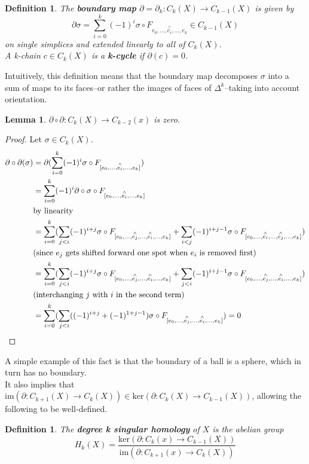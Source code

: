\documentclass{article}
\newtheorem{definition}[theorem]{Definition}
\newtheorem{lemma}[theorem]{Lemma}
\begin{document}
\begin{definition}
The \textbf{boundary map} $\partial=\partial_k\colon C_k(X)\to C_{k-1}(X)$ is given by\[\partial\sigma=\sum_{i=0}^k(-1)^i\sigma\circ F_{e_0,...,\overset{\wedge}{e_i},...,e_k}\in C_{k-1}(X)\]
on single simplices and extended linearly to all of $C_k(X)$.\\
A k-chain $c\in C_k(X)$ is a \textbf{k-cycle} if $\partial(c)=0$.
\end{definition}
\noindent Intuitively, this definition means that the boundary map decomposes $\sigma$ into a sum of maps to its faces--or rather the images of faces of $\Delta^k$--taking into account orientation.


\begin{lemma}
$\partial\circ\partial\colon C_k(X)\to C_{k-2}(x)$ is zero.
\end{lemma}
\begin{proof}
Let $\sigma\in C_k(X)$.
\begin{align*}
\partial\circ\partial (\sigma)&=\partial(\sum_{i=0}^k(-1)^i\sigma\circ F_{[e_0,...,\overset{\wedge}{e_i},...,e_k]})\\
&=\sum_{i=0}^k(-1)^i\partial\circ\sigma\circ F_{[e_0,...,\overset{\wedge}{e_i},...,e_k]} \\&\text{by linearity}\\
&=\sum_{i=0}^k(\sum_{j<i}(-1)^{i+j}\sigma\circ F_{[e_0,...,\overset{\wedge}{e_j},...,\overset{\wedge}{e_i},...,e_k]} + \sum_{i<j}(-1)^{i+j-1}\sigma\circ F_{[e_0,...,\overset{\wedge}{e_i},...,\overset{\wedge}{e_j},...,e_k]}) \\&\text{(since }e_j \text{ gets shifted forward one spot when }e_i\text{ is removed first)}\\
&=\sum_{i=0}^k(\sum_{j<i}(-1)^{i+j}\sigma\circ F_{[e_0,...,\overset{\wedge}{e_j},...,\overset{\wedge}{e_i},...,e_k]} + \sum_{j<i}(-1)^{i+j-1}\sigma\circ F_{[e_0,...,\overset{\wedge}{e_j},...,\overset{\wedge}{e_i},...,e_k]})
\\&\text{(interchanging }j\text{ with }i\text{ in the second term)}\\
&=\sum_{i=0}^k(\sum_{j<i}((-1)^{i+j}+(-1)^{1+j-1})\sigma\circ F_{[e_0,...,\overset{\wedge}{e_j},...,\overset{\wedge}{e_i},...,e_k]})=0 \qedhere
\end{align*}
\end{proof}

\noindent A simple example of this fact is that the boundary of a ball is a sphere, which in turn has no boundary.\\
It also implies that $\text{im}(\partial:C_{k+1}(X)\rightarrow C_k(X))\in\text{ker}(\partial:C_{k}(X)\rightarrow C_{k-1}(X))$,
allowing the following to be well-defined.
\begin{definition}
The \textbf{degree k singular homology} of $X$ is the abelian group
\[H_k(X)=\frac{\text{ker}(\partial:C_{k}(x)\rightarrow C_{k-1}(X))}{\text{im}(\partial:C_{k+1}(x)\rightarrow C_k(X))}\]
\end{definition}
\end{document}
